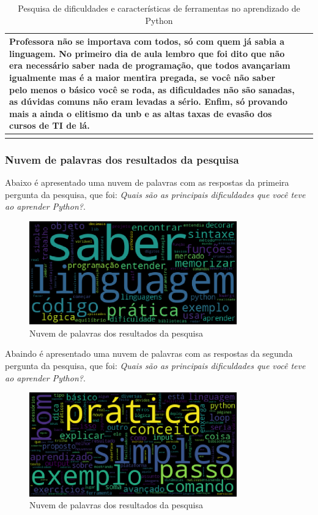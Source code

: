\begin{longtable}{| p{} | p{} |}
    Professora não se importava com todos, só com quem já sabia a linguagem. No primeiro dia de aula lembro que foi dito que não era necessário saber nada de programação, que todos avançariam igualmente mas é a maior mentira pregada, se você não saber pelo menos o básico você se roda, as dificuldades não são sanadas, as dúvidas comuns não eram levadas a sério. Enfim, só provando mais a ainda o elitismo da unb e as altas taxas de evasão dos cursos de TI de lá. & ~ \\ \hline
    \caption{Pesquisa de dificuldades e características de ferramentas no aprendizado de Python}
    \label{tab:pesquisa}
\end{longtable}

\subsubsection{Nuvem de palavras dos resultados da pesquisa}

Abaixo é apresentado uma nuvem de palavras com as respostas da primeira pergunta da pesquisa, que foi: \textit{Quais são as principais dificuldades que você teve ao aprender Python?}.

\begin{figure}[h]
    \centering
    \includegraphics[width=0.8\textwidth]{figuras/nuvem_dificuldades.eps}
    \caption{Nuvem de palavras dos resultados da pesquisa}
    \label{nuvem_dificuldades}
\end{figure}

Abaindo é apresentado uma nuvem de palavras com as respostas da segunda pergunta da pesquisa, que foi: \textit{Quais são as principais dificuldades que você teve ao aprender Python?}.

\begin{figure}[h]
    \centering
    \includegraphics[width=0.8\textwidth]{figuras/nuvem_ferramentas.eps}
    \caption{Nuvem de palavras dos resultados da pesquisa}
    \label{nuvem_ferramentas}
\end{figure}

